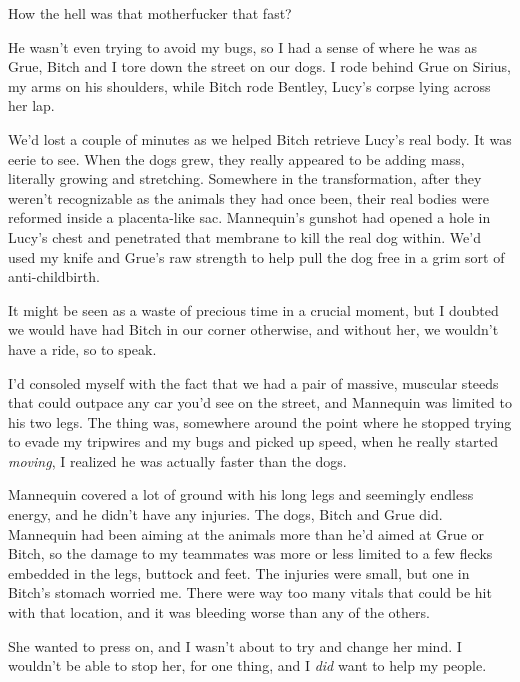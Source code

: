 





How the hell was that motherfucker that fast?



He wasn't even trying to avoid my bugs, so I had a sense of where he was as Grue, Bitch and I tore down the street on our dogs.  I rode behind Grue on Sirius, my arms on his shoulders, while Bitch rode Bentley, Lucy's corpse lying across her lap.



We'd lost a couple of minutes as we helped Bitch retrieve Lucy's real body.  It was eerie to see.  When the dogs grew, they really appeared to be adding mass, literally growing and stretching.  Somewhere in the transformation, after they weren't recognizable as the animals they had once been, their real bodies were reformed inside a placenta-like sac.  Mannequin's gunshot had opened a hole in Lucy's chest and penetrated that membrane to kill the real dog within.  We'd used my knife and Grue's raw strength to help pull the dog free in a grim sort of anti-childbirth.



It might be seen as a waste of precious time in a crucial moment, but I doubted we would have had Bitch in our corner otherwise, and without her, we wouldn't have a ride, so to speak.



I'd consoled myself with the fact that we had a pair of massive, muscular steeds that could outpace any car you'd see on the street, and Mannequin was limited to his two legs.  The thing was, somewhere around the point where he stopped trying to evade my tripwires and my bugs and picked up speed, when he really started \emph{moving}, I realized he was actually faster than the dogs.



Mannequin covered a lot of ground with his long legs and seemingly endless energy, and he didn't have any injuries.  The dogs, Bitch and Grue did.  Mannequin had been aiming at the animals more than he'd aimed at Grue or Bitch, so the damage to my teammates was more or less limited to a few flecks embedded in the legs, buttock and feet.  The injuries were small, but one in Bitch's stomach worried me.  There were way too many vitals that could be hit with that location, and it was bleeding worse than any of the others.



She wanted to press on, and I wasn't about to try and change her mind.  I wouldn't be able to stop her, for one thing, and I \emph{did }want to help my people.




